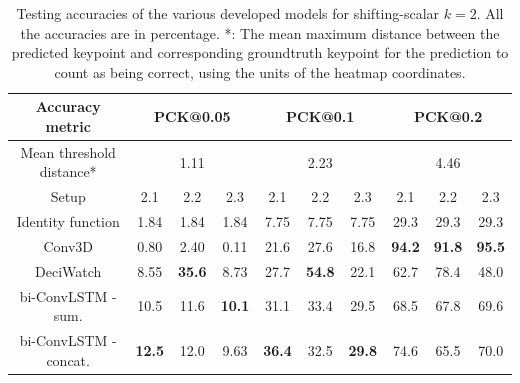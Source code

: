 \documentclass[./main.tex]{subfiles}
\begin{document}
\begin{table}[htbp]
    \begin{tabular}{c||ccc|ccc|ccc}
        \hline
        Accuracy metric & \multicolumn{3}{c}{PCK@0.05} & \multicolumn{3}{c}{PCK@0.1} & \multicolumn{3}{c}{PCK@0.2} \\
        \hline
        Mean threshold distance* & \multicolumn{3}{c}{1.11} & \multicolumn{3}{c}{2.23} & \multicolumn{3}{c}{4.46} \\
        \hline
        Setup & 2.1 & 2.2 & 2.3 & 2.1 & 2.2 & 2.3 & 2.1 & 2.2 & 2.3 \\
        \hline
        \hline
        Identity function & 1.84 & 1.84 & 1.84 & 7.75 & 7.75 & 7.75 & 29.3 & 29.3 & 29.3 \\
        Conv3D & 0.80 & 2.40 & 0.11 & 21.6 & 27.6 & 16.8 & \textbf{94.2} & \textbf{91.8} & \textbf{95.5} \\
        DeciWatch & 8.55 & \textbf{35.6} & 8.73 & 27.7 & \textbf{54.8} & 22.1 & 62.7 & 78.4 & 48.0 \\
        bi-ConvLSTM - sum. & 10.5 & 11.6 & \textbf{10.1} & 31.1 & 33.4 & 29.5 & 68.5 & 67.8 & 69.6 \\
        bi-ConvLSTM - concat. & \textbf{12.5} & 12.0 & 9.63 & \textbf{36.4} & 32.5 & \textbf{29.8} & 74.6 & 65.5 & 70.0 \\
        \hline
    \end{tabular}
    \caption{Testing accuracies of the various developed models for shifting-scalar $k = 2$. All the accuracies are in percentage. *: The mean maximum distance between the predicted keypoint and corresponding groundtruth keypoint for the prediction to count as being correct, using the units of the heatmap coordinates.}
    \label{tab:pretrain_test_accs_2}
\end{table}
\end{document}
